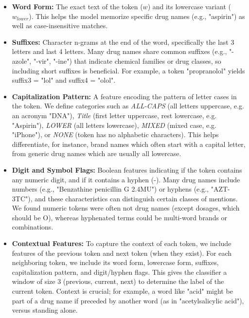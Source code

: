 \begin{itemize}
    \item \textbf{Word Form:} The exact text of the token ($w$) and its lowercase variant ($w_{lower}$). This helps the model memorize specific drug names (e.g., "aspirin") as well as case-insensitive matches.
    
    \item \textbf{Suffixes:} Character n-grams at the end of the word, specifically the last 3 letters and last 4 letters. Many drug names share common suffixes (e.g., "-azole", "-vir", "-ine") that indicate chemical families or drug classes, so including short suffixes is beneficial. For example, a token "propranolol" yields suffix3 = "lol" and suffix4 = "olol".
    
    \item \textbf{Capitalization Pattern:} A feature encoding the pattern of letter cases in the token. We define categories such as \textit{ALL-CAPS} (all letters uppercase, e.g. an acronym "DNA"), \textit{Title} (first letter uppercase, rest lowercase, e.g. "Aspirin"), \textit{LOWER} (all letters lowercase), \textit{MIXED} (mixed case, e.g. "iPhone"), or \textit{NONE} (token has no alphabetic characters). This helps differentiate, for instance, brand names which often start with a capital letter, from generic drug names which are usually all lowercase.
    
    \item \textbf{Digit and Symbol Flags:} Boolean features indicating if the token contains any numeric digit, and if it contains a hyphen (-). Many drug names include numbers (e.g., "Benzathine penicillin G 2.4MU") or hyphens (e.g., "AZT-3TC"), and these characteristics can distinguish certain classes of mentions. We found numeric tokens were often not drug names (except dosages, which should be O), whereas hyphenated terms could be multi-word brands or combinations.
    
    \item \textbf{Contextual Features:} To capture the context of each token, we include features of the previous token and next token (when they exist). For each neighboring token, we include its word form, lowercase form, suffixes, capitalization pattern, and digit/hyphen flags. This gives the classifier a window of size 3 (previous, current, next) to determine the label of the current token. Context is crucial; for example, a word like "acid" might be part of a drug name if preceded by another word (as in "acetylsalicylic acid"), versus standing alone.
    

\end{itemize}
